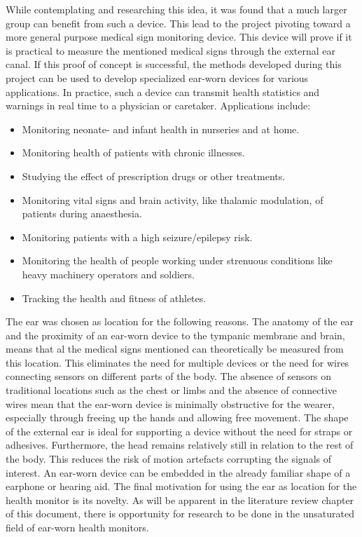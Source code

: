 While contemplating and researching this idea, it was found that a much larger group can benefit from such a device. This lead to the project pivoting toward a more general purpose medical sign monitoring device. This device will prove if it is practical to measure the mentioned medical signs through the external ear canal. If this proof of concept is successful, the methods developed during this project can be used to develop specialized ear-worn devices for various applications. In practice, such a device can transmit health statistics and warnings in real time to a physician or caretaker. Applications include:

\begin{itemize}
\item Monitoring neonate- and infant health in nurseries and at home.
\item Monitoring health of patients with chronic illnesses.
\item Studying the effect of prescription drugs or other treatments.
\item Monitoring vital signs and brain activity, like thalamic modulation, of patients during anaesthesia.
\item Monitoring patients with a high seizure/epilepsy risk.
\item Monitoring the health of people working under strenuous conditions like heavy machinery operators and soldiers.
\item Tracking the health and fitness of athletes.
\end{itemize}

The ear was chosen as location for the following reasons. The anatomy of the ear and the proximity of an ear-worn device to the tympanic membrane and brain, means that al the medical signs mentioned can theoretically be measured from this location. This eliminates the need for multiple devices or the need for wires connecting sensors on different parts of the body. The absence of sensors on traditional locations such as the chest or limbs and the absence of connective wires mean that the ear-worn device is minimally obstructive for the wearer, especially through freeing up the hands and allowing free movement. The shape of the external ear is ideal for supporting a device without the need for straps or adhesives. Furthermore, the head remains relatively still in relation to the rest of the body. This reduces the risk of motion artefacts corrupting the signals of interest. An ear-worn device can be embedded in the already familiar shape of a earphone or hearing aid. The final motivation for using the ear as location for the health monitor is its novelty. As will be apparent in the literature review chapter of this document, there is opportunity for research to be done in the unsaturated field of ear-worn health monitors.

